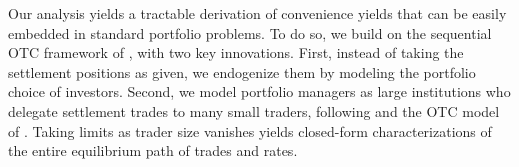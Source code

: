 Our analysis yields a tractable derivation of convenience yields that can be easily embedded in standard portfolio problems.
To do so, we build on the sequential OTC framework of \citet*{AL15},   with two key innovations.
First, instead of taking the settlement positions as
given, we endogenize them by modeling the portfolio choice  of investors.
Second, we model portfolio managers as large institutions who delegate
settlement trades to many small traders, following \citet{Shi1997}
and the OTC model of \citet*{AEW15}. Taking limits as trader size
vanishes yields closed-form characterizations of the entire equilibrium
path of trades and rates.


